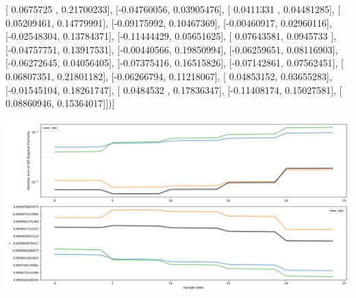 \documentclass{article}
\begin{document}
       [ 0.0675725 ,  0.21700233],
       [-0.04760056,  0.03905476],
       [ 0.0411331 ,  0.04481285],
       [ 0.05209461,  0.14779991],
       [-0.09175992,  0.10467369],
       [-0.00460917,  0.02960116],
       [-0.02548304,  0.13784371],
       [-0.11444429,  0.05651625],
       [ 0.07643581,  0.0945733 ],
       [-0.04757751,  0.13917531],
       [-0.00440566,  0.19850994],
       [-0.06259651,  0.08116903],
       [-0.06272645,  0.04056405],
       [-0.07375416,  0.16515826],
       [-0.07142861,  0.07562451],
       [ 0.06807351,  0.21801182],
       [-0.06266794,  0.11218067],
       [ 0.04853152,  0.03655283],
       [-0.01545104,  0.18261747],
       [ 0.0484532 ,  0.17836347],
       [-0.11408174,  0.15027581],
       [ 0.08860946,  0.15364017]])]
\begin{center}
\includegraphics[scale=.9]{report_pickled_controls202/control_dpn_all.png}

\end{center}
\end{document}
